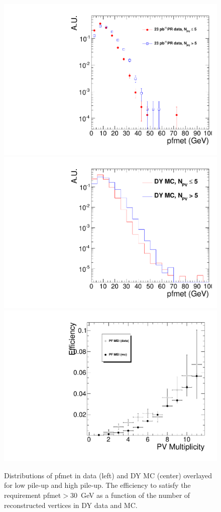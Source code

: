 \newcommand{\met}{\ensuremath{\mspace{3mu}/\mspace{-12.0mu}E_{T}}} 


\begin{figure}[hbt]
\begin{center}
\includegraphics[width=0.3\linewidth]{figures/pfmet_data.pdf} 
\includegraphics[width=0.3\linewidth]{figures/pfmet_dymc.pdf}
\includegraphics[width=0.3\linewidth]{figures/pfmet_Eff30.pdf} 
\caption{\label{fig:met_pu}\protect Distributions of pfmet in data (left) and DY MC (center) 
overlayed for low pile-up and high pile-up. The efficiency to satisfy the requirement pfmet$>30$~GeV as a function
of the number of reconstructed vertices in DY data and MC.}
\end{center}
\end{figure}

